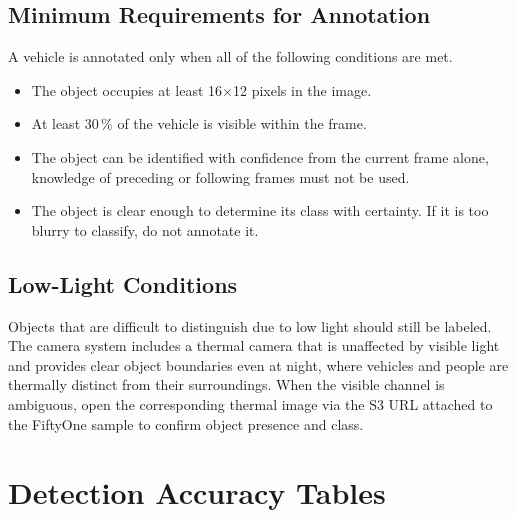 \documentclass[12pt,oneside,bibtotoc,liststotoc]{scrbook}
\begin{document}
\vspace{-2em}
\section{Minimum Requirements for Annotation}
\vspace{-0.5em}

A vehicle is annotated only when all of the following conditions are met.

\begin{itemize}
    \item The object occupies at least 16$\times$12 pixels in the image.
    \item At least 30\,\% of the vehicle is visible within the frame.
    \item The object can be identified with confidence from the current frame alone,
          knowledge of preceding or following frames must not be used.
    \item The object is clear enough to determine its class with certainty.
          If it is too blurry to classify, do not annotate it.
\end{itemize}

\vspace{-2em}
\section{Low-Light Conditions}
\vspace{-0.5em}

Objects that are difficult to distinguish due to low light should still be labeled.
The camera system includes a thermal camera that is unaffected by visible light and
provides clear object boundaries even at night, where vehicles and people are
thermally distinct from their surroundings.
When the visible channel is ambiguous, open the corresponding thermal image via
the S3 URL attached to the FiftyOne sample to confirm object presence and class.

\newpage

\chapter{Detection Accuracy Tables}
\label{chap:detection_accuracy_tables}
\end{document}
